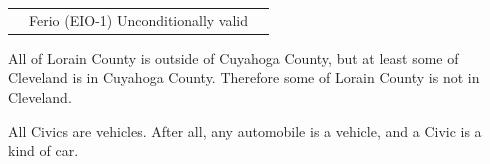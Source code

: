 {\begin{longtabu}{p{.1\linewidth}p{.5\linewidth}p{.4\linewidth}}
& Ferio (EIO-1) \newline Unconditionally valid

\end{longtabu}


\begin{exercises}

\item All of Lorain County is outside of Cuyahoga County, but at least some of Cleveland is in Cuyahoga County. Therefore some of Lorain County is not in Cleveland. 


\item All Civics are vehicles. After all, any automobile is a vehicle, and a Civic is a kind of car.  

\end{exercises}}
